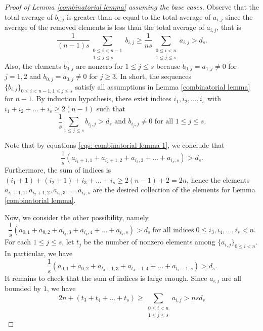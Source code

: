 \documentclass[11pt]{amsart}
\theoremstyle{plain} %
\theoremstyle{remark}
\numberwithin{equation}{section}
\begin{document}
\begin{proof}[Proof of Lemma \ref{combinatorial lemma} assuming the base cases]
    Observe that the total average of $b_{i,j}$ is greater than or equal to the total average of $a_{i,j}$ since the average of the removed elements is less than the total average of $a_{i,j}$, that is
    \begin{equation*}
        \frac{1}{(n-1)s}\sum_{\substack{0\leq i<n-1\\1\leq j\leq s}}b_{i,j}\geq \frac{1}{ns}\sum_{\substack{0\leq i<n\\1\leq j\leq s}}a_{i,j}>d_s.
    \end{equation*}
    Also, the elements $b_{0,j}$ are nonzero for $1\leq j\leq s$ because $b_{0,j}=a_{1,j}\neq 0$ for $j=1,2$ and $b_{0,j}=a_{0,j}\neq 0$ for $j\geq 3$. In short, the sequences $\{b_{i,j}\}_{0\leq i<n-1,1\leq j\leq s}$ satisfy all assumptions in Lemma \ref{combinatorial lemma} for $n-1$. By induction hypothesis, there exist indices $i_1,i_2,...,i_s$ with $i_1+i_2+...+i_s\geq 2(n-1)$ such that
    \begin{equation*}
        \text{$\frac{1}{s}\sum_{1\leq j\leq s}b_{i_j,j}>d_s$ and $b_{i_j,j}\neq 0$ for all $1\leq j\leq s$.}
    \end{equation*}

    Note that by equations \eqref{eqs: combinatorial lemma 1}, we conclude that
    \begin{equation*}
        \frac{1}{s}(a_{i_1+1,1}+a_{i_2+1,2}+a_{i_3,3}+...+a_{i_s,s})>d_s.
    \end{equation*}
    Furthermore, the sum of indices is $(i_1+1)+(i_2+1)+i_3+...+i_s\geq 2(n-1)+2=2n$, hence the elements $a_{i_1+1,1},a_{i_2+1,2},a_{i_3,3},...,a_{i_s,s}$ are the desired collection of the elements for Lemma \ref{combinatorial lemma}.

    Now, we consider the other possibility, namely
    \begin{equation*}
        \frac{1}{s}(a_{0,1}+a_{0,2}+a_{i_3,3}+a_{i_4,4}+...+a_{i_s,s})> d_s\;\text{for all indices}\;0\leq i_3,i_4,...,i_s<n.
    \end{equation*}
    For each $1\leq j\leq s$, let $t_j$ be the number of nonzero elements among $\{a_{i,j}\}_{0\leq i<n}$. In particular, we have
    \begin{equation*}
        \frac{1}{s}(a_{0,1}+a_{0,2}+a_{t_3-1,3}+a_{t_4-1,4}+...+a_{t_s-1,s})> d_s.
    \end{equation*}
    It remains to check that the sum of indices is large enough. Since $a_{i,j}$ are all bounded by $1$, we have
    \begin{equation*}
        2n+(t_3+t_4+...+t_s)\geq \sum_{\substack{0\leq i<n\\1\leq j\leq s}}a_{i,j}>nsd_s
    \end{equation*}


\end{proof}
\end{document}
